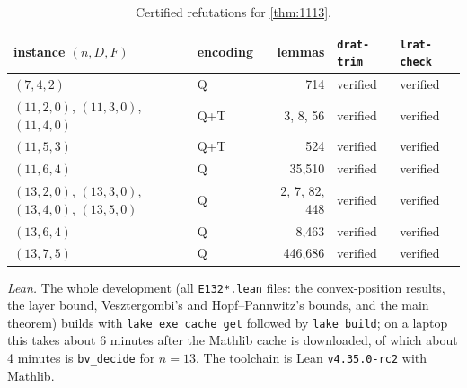 \documentclass[11pt]{amsart}
\theoremstyle{definition}
\theoremstyle{remark}
\begin{document}
\begin{table}[ht]
\centering
\renewcommand{\arraystretch}{1.15}
\begin{tabular}{@{}llrll@{}}
\toprule
instance $(n,D,F)$ & encoding & lemmas & \texttt{drat-trim} & \texttt{lrat-check}\\
\midrule
$(7,4,2)$ & Q & 714 & verified & verified\\
$(11,2,0)$, $(11,3,0)$, $(11,4,0)$ & Q+T & 3, 8, 56 & verified & verified\\
$(11,5,3)$ & Q+T & 524 & verified & verified\\
$(11,6,4)$ & Q & 35,510 & verified & verified\\
$(13,2,0)$, $(13,3,0)$, $(13,4,0)$, $(13,5,0)$ & Q & 2, 7, 82, 448 & verified & verified\\
$(13,6,4)$ & Q & 8,463 & verified & verified\\
$(13,7,5)$ & Q & 446,686 & verified & verified\\
\bottomrule
\end{tabular}
\caption{Certified refutations for \cref{thm:1113}.}
\end{table}

\emph{Lean.} The whole development (all \texttt{E132*.lean} files: the convex-position results, the layer bound, Vesztergombi's and Hopf--Pannwitz's bounds, and the main theorem) builds with \texttt{lake exe cache get} followed by \texttt{lake build}; on a laptop this takes about 6 minutes after the Mathlib cache is downloaded, of which about 4 minutes is \texttt{bv\_decide} for $n=13$. The toolchain is Lean \texttt{v4.35.0-rc2} with Mathlib.



\end{document}
